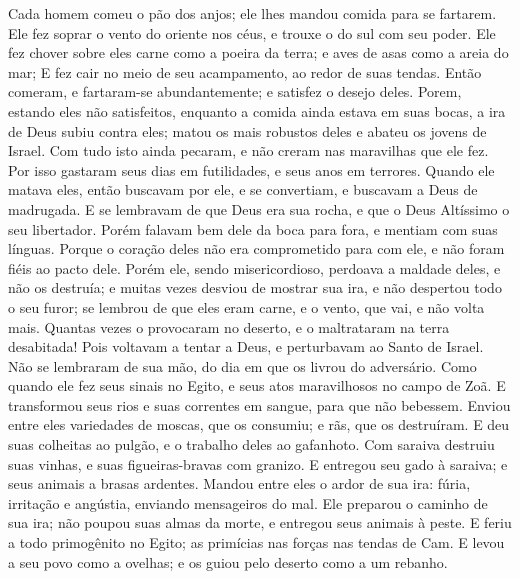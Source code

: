 {Cada homem
{} comeu o pão dos anjos; ele lhes mandou comida para se fartarem.
Ele fez soprar o vento do oriente nos céus, e trouxe o
{} do sul com seu poder.
Ele fez chover sobre eles carne como a poeira da terra; e aves de asas como a areia do mar;
E
{} fez cair no meio de seu acampamento, ao redor de suas tendas.
Então comeram, e fartaram-se abundantemente; e satisfez o desejo deles.
Porem, estando eles
{} não satisfeitos, enquanto a comida ainda estava em suas bocas,
a ira de Deus subiu contra eles; matou os mais robustos deles e abateu os jovens de Israel.
Com tudo isto ainda pecaram, e não creram nas maravilhas que ele fez.
Por isso gastaram seus dias em futilidades, e seus anos em terrores.
Quando ele matava
{} eles, então buscavam por ele, e se convertiam, e buscavam a Deus de madrugada.
E se lembravam de que Deus era sua rocha, e que o Deus Altíssimo
{} o seu libertador.
Porém falavam bem dele da boca para fora, e mentiam com suas línguas.
Porque o coração deles não era comprometido para com ele, e não foram fiéis ao pacto dele.
Porém ele, sendo misericordioso, perdoava a maldade deles, e não os destruía; e muitas vezes desviou de mostrar sua ira, e não despertou todo o seu furor;
 se lembrou de que eles eram carne, e
{} o vento, que vai, e não volta mais.
Quantas vezes o provocaram no deserto, e o maltrataram na terra desabitada!
Pois voltavam a tentar a Deus, e perturbavam ao Santo de Israel.
Não se lembraram de sua mão,
{} do dia em que os livrou do adversário.
Como quando ele fez seus sinais no Egito, e seus atos maravilhosos no campo de Zoã.
E transformou seus rios e suas correntes em sangue, para que não bebessem.
Enviou entre eles variedades de moscas, que os consumiu; e rãs, que os destruíram.
E deu suas colheitas ao pulgão, e o trabalho deles ao gafanhoto.
Com saraiva destruiu suas vinhas, e suas figueiras-bravas com granizo.
E entregou seu gado à saraiva; e seus animais a brasas ardentes.
Mandou entre eles o ardor de sua ira: fúria, irritação e angústia, enviando mensageiros do mal.
Ele preparou o caminho de sua ira; não poupou suas almas da morte, e entregou seus animais à peste.
E feriu
{} a todo primogênito no Egito; as primícias nas forças nas tendas de Cam.
E levou a seu povo como a ovelhas; e os guiou pelo deserto como a um rebanho.
}
